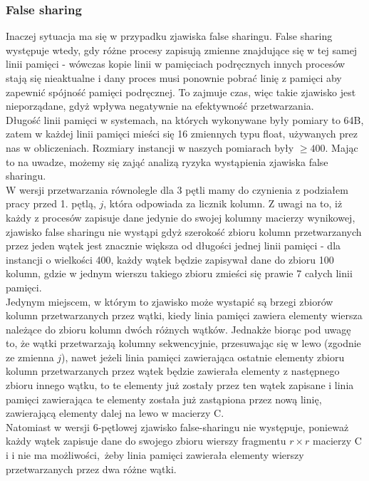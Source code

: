 \documentclass[10pt,a4paper]{article}
\begin{document}
\subsubsection*{False sharing}
Inaczej sytuacja ma się w przypadku zjawiska false sharingu. False sharing występuje wtedy, gdy
różne procesy zapisują zmienne znajdujące się w tej samej linii pamięci - wówczas kopie linii
w pamięciach podręcznych innych procesów stają się nieaktualne i dany proces musi ponownie pobrać
linię z pamięci aby zapewnić spójność pamięci podręcznej. To zajmuje czas, więc takie zjawisko
jest nieporządane, gdyż wpływa negatywnie na efektywność przetwarzania.\\
Długość linii pamięci w systemach, na których wykonywane były pomiary to 64B, zatem w każdej
linii pamięci mieści się 16 zmiennych typu float, używanych prez nas w obliczeniach. Rozmiary
instancji w naszych pomiarach były $\geq 400$. Mając to na uwadze, możemy się zająć analizą ryzyka
wystąpienia zjawiska false sharingu.\\

W wersji przetwarzania równolegle dla 3 pętli mamy do czynienia z podziałem pracy przed 1. pętlą, $j$,
która odpowiada za licznik kolumn.
Z uwagi na to, iż każdy z procesów zapisuje dane jedynie do swojej kolumny macierzy wynikowej, 
zjawisko false sharingu nie wystąpi gdyż szerokość zbioru kolumn przetwarzanych przez jeden wątek jest
znacznie większa od długości jednej linii pamięci - dla instancji o wielkości 400, każdy wątek będzie
zapisywał dane do zbioru 100 kolumn, gdzie w jednym wierszu takiego zbioru zmieści się prawie 7 całych linii pamięci. \\
Jedynym miejscem, w którym to zjawisko może wystapić są brzegi zbiorów kolumn przetwarzanych przez wątki, kiedy linia pamięci 
zawiera elementy wiersza należące do zbioru kolumn dwóch różnych wątków. Jednakże biorąc pod uwagę to, że wątki przetwarzają kolumny
sekwencyjnie, przesuwając się w lewo (zgodnie ze zmienna $j$), nawet jeżeli linia pamięci zawierająca ostatnie elementy zbioru kolumn przetwarzanych 
przez wątek będzie zawierała elementy z następnego zbioru innego wątku, to te elementy już zostały przez ten wątek zapisane i linia pamięci zawierająca 
te elementy została już zastąpiona przez nową linię, zawierającą elementy dalej na lewo w macierzy C.  \\

Natomiast w wersji 6-pętlowej zjawisko false-sharingu nie występuje, ponieważ każdy wątek zapisuje dane do swojego 
zbioru wierszy fragmentu $r \times r$ macierzy C i i nie ma możliwości, żeby linia pamięci zawierała elementy wierszy przetwarzanych przez
dwa różne wątki.
\end{document}
